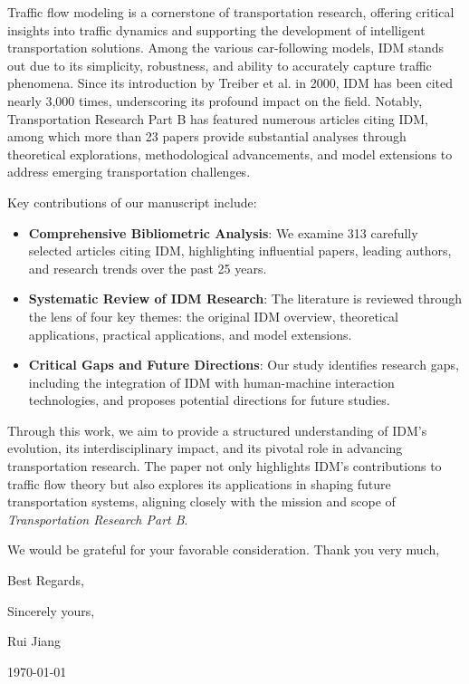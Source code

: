 \documentclass{article}
\begin{document}
Traffic flow modeling is a cornerstone of transportation research, offering critical insights into traffic dynamics and supporting the development of intelligent transportation solutions. Among the various car-following models, IDM stands out due to its simplicity, robustness, and ability to accurately capture traffic phenomena. Since its introduction by Treiber et al. in 2000, IDM has been cited nearly 3,000 times, underscoring its profound impact on the field. Notably, Transportation Research Part B has featured numerous articles citing IDM, among which more than 23 papers provide substantial analyses through theoretical explorations, methodological advancements, and model extensions to address emerging transportation challenges.

Key contributions of our manuscript include:
\begin{itemize}
    \item \textbf{Comprehensive Bibliometric Analysis}: We examine 313 carefully selected articles citing IDM, highlighting influential papers, leading authors, and research trends over the past 25 years.
    \item \textbf{Systematic Review of IDM Research}: The literature is reviewed through the lens of four key themes: the original IDM overview, theoretical applications, practical applications, and model extensions.
    \item \textbf{Critical Gaps and Future Directions}:  Our study identifies research gaps, including the integration of IDM with human-machine interaction technologies, and proposes potential directions for future studies.

\end{itemize}

Through this work, we aim to provide a structured understanding of IDM’s evolution, its interdisciplinary impact, and its pivotal role in advancing transportation research. The paper not only highlights IDM’s contributions to traffic flow theory but also explores its applications in shaping future transportation systems, aligning closely with the mission and scope of \textit{Transportation Research Part B}.


We would be grateful for your favorable consideration.
\bigskip %
Thank you very much,

Best Regards,

Sincerely yours,

Rui Jiang

\today
\end{document}
